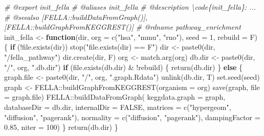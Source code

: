 \documentclass[
]{article}
\newenvironment{Shaded}{\begin{snugshade}}{\end{snugshade}}
\newcommand{\AttributeTok}[1]{\textcolor[rgb]{0.77,0.63,0.00}{#1}}
\newcommand{\CommentTok}[1]{\textcolor[rgb]{0.56,0.35,0.01}{\textit{#1}}}
\newcommand{\ConstantTok}[1]{\textcolor[rgb]{0.00,0.00,0.00}{#1}}
\newcommand{\ControlFlowTok}[1]{\textcolor[rgb]{0.13,0.29,0.53}{\textbf{#1}}}
\newcommand{\DecValTok}[1]{\textcolor[rgb]{0.00,0.00,0.81}{#1}}
\newcommand{\FloatTok}[1]{\textcolor[rgb]{0.00,0.00,0.81}{#1}}
\newcommand{\FunctionTok}[1]{\textcolor[rgb]{0.00,0.00,0.00}{#1}}
\newcommand{\NormalTok}[1]{#1}
\newcommand{\OtherTok}[1]{\textcolor[rgb]{0.56,0.35,0.01}{#1}}
\newcommand{\SpecialCharTok}[1]{\textcolor[rgb]{0.00,0.00,0.00}{#1}}
\newcommand{\StringTok}[1]{\textcolor[rgb]{0.31,0.60,0.02}{#1}}
\begin{document}
\begin{Shaded}
\begin{Highlighting}[]
\CommentTok{\#\textquotesingle{} @export init\_fella}
\CommentTok{\#\textquotesingle{} @aliases init\_fella}
\CommentTok{\#\textquotesingle{} @description \textbackslash{}code\{init\_fella\}: ...}
\CommentTok{\#\textquotesingle{} @seealso [FELLA::buildDataFromGraph()], [FELLA::buildGraphFromKEGGREST()]}
\CommentTok{\#\textquotesingle{} @rdname pathway\_enrichment}
\NormalTok{init\_fella }\OtherTok{\textless{}{-}} 
  \ControlFlowTok{function}\NormalTok{(dir, }\AttributeTok{org =} \FunctionTok{c}\NormalTok{(}\StringTok{"hsa"}\NormalTok{, }\StringTok{"mmu"}\NormalTok{, }\StringTok{"rno"}\NormalTok{), }\AttributeTok{seed =} \DecValTok{1}\NormalTok{, }\AttributeTok{rebuild =}\NormalTok{ F) \{}
    \ControlFlowTok{if}\NormalTok{ (}\SpecialCharTok{!}\FunctionTok{file.exists}\NormalTok{(dir))}
      \FunctionTok{stop}\NormalTok{(}\StringTok{"file.exists(dir) == F"}\NormalTok{)}
\NormalTok{    dir }\OtherTok{\textless{}{-}} \FunctionTok{paste0}\NormalTok{(dir, }\StringTok{"/fella\_pathway"}\NormalTok{)}
    \FunctionTok{dir.create}\NormalTok{(dir, F)}
\NormalTok{    org }\OtherTok{\textless{}{-}} \FunctionTok{match.arg}\NormalTok{(org)}
\NormalTok{    db.dir }\OtherTok{\textless{}{-}} \FunctionTok{paste0}\NormalTok{(dir, }\StringTok{"/"}\NormalTok{, org, }\StringTok{".db.dir"}\NormalTok{)}
    \ControlFlowTok{if}\NormalTok{ (}\FunctionTok{file.exists}\NormalTok{(db.dir) }\SpecialCharTok{\&} \SpecialCharTok{!}\NormalTok{rebuild) \{}
      \FunctionTok{return}\NormalTok{(db.dir)}
\NormalTok{    \} }\ControlFlowTok{else}\NormalTok{ \{}
\NormalTok{      graph.file }\OtherTok{\textless{}{-}} \FunctionTok{paste0}\NormalTok{(dir, }\StringTok{"/"}\NormalTok{, org, }\StringTok{".graph.Rdata"}\NormalTok{)}
      \FunctionTok{unlink}\NormalTok{(db.dir, T)}
      \FunctionTok{set.seed}\NormalTok{(seed)}
\NormalTok{      graph }\OtherTok{\textless{}{-}}\NormalTok{ FELLA}\SpecialCharTok{::}\FunctionTok{buildGraphFromKEGGREST}\NormalTok{(}\AttributeTok{organism =}\NormalTok{ org)}
      \FunctionTok{save}\NormalTok{(graph, }\AttributeTok{file =}\NormalTok{ graph.file)}
\NormalTok{      FELLA}\SpecialCharTok{::}\FunctionTok{buildDataFromGraph}\NormalTok{(}
        \AttributeTok{keggdata.graph =}\NormalTok{ graph,}
        \AttributeTok{databaseDir =}\NormalTok{ db.dir, }\AttributeTok{internalDir =} \ConstantTok{FALSE}\NormalTok{,}
        \AttributeTok{matrices =} \FunctionTok{c}\NormalTok{(}\StringTok{"hypergeom"}\NormalTok{, }\StringTok{"diffusion"}\NormalTok{, }\StringTok{"pagerank"}\NormalTok{),}
        \AttributeTok{normality =} \FunctionTok{c}\NormalTok{(}\StringTok{"diffusion"}\NormalTok{, }\StringTok{"pagerank"}\NormalTok{),}
        \AttributeTok{dampingFactor =} \FloatTok{0.85}\NormalTok{, }\AttributeTok{niter =} \DecValTok{100}\NormalTok{)}
\NormalTok{    \}}
    \FunctionTok{return}\NormalTok{(db.dir)}
\NormalTok{  \}}


\end{Highlighting}
\end{Shaded}
\end{document}
